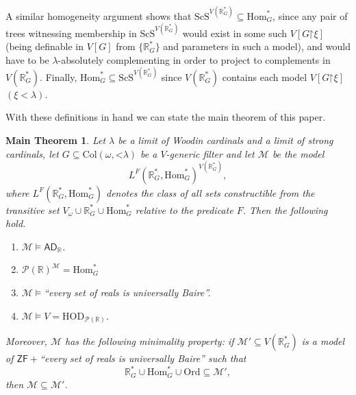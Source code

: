 \documentclass[fleqn, 11pt]{amsart}
\theoremstyle{plain}
\newtheorem*{mainthm*}{Main Theorem}
\theoremstyle{definition}
\theoremstyle{remark}
\newcommand{\Ord}{\mathrm{Ord}}
\newcommand{\HOD}{\mathrm{HOD}}
\newcommand{\Hom}{\mathrm{Hom}}
\newcommand{\ScS}{\mathrm{ScS}}
\newcommand{\HC}{\mathrm{HC}}
\newcommand{\bbR}{\mathbb{R}}
\newcommand{\ADR}{\mathsf{AD}_{\bbR}}
\newcommand{\Col}{\mathrm{Col}}
\newcommand{\restrict}{\mathord{\restriction}}
\newcommand{\powerset}{\mathcal{P}}
\begin{document}
A similar homogeneity argument shows that 
$\ScS^{V(\mathbb{R}^*_G)} \subseteq \Hom^*_G$, since any pair of trees witnessing membership in $\ScS^{V(\mathbb{R}^*_G)}$ would exist in some such $V[G \restrict \xi]$ (being definable in $V[G]$ from $\{\bbR^{*}_{G}\}$ and parameters in such a model), and would have to be $\lambda$-absolutely complementing in order to project to complements in $V(\mathbb{R}^{*}_{G})$. 
Finally, $\Hom^{*}_{G} \subseteq \ScS^{V(\bbR^{*}_{G})}$ since $V(\bbR^{*}_{G})$ contains each model $V[G \restrict \xi]$ $(\xi < \lambda)$. 


With these definitions in hand we can state the main theorem of this paper. 


\begin{mainthm*}
 Let $\lambda$ be a limit of Woodin cardinals and a limit of strong cardinals, let $G \subseteq \Col(\omega,\mathord{<}\lambda)$ be a $V$-generic filter and let $\mathcal{M}$ be the model \[L^F(\mathbb{R}^*_G, \Hom^*_G)^{V(\mathbb{R}^*_G)},\]
 where $L^F(\mathbb{R}^*_G, \Hom^*_G)$ denotes the class of all sets constructible from the transitive set $V_\omega \cup \mathbb{R}^*_G \cup \Hom^*_G$
 relative to the predicate $F$.
 Then the following hold. 
 \begin{enumerate}
  \item\label{item-ad-plus} $\mathcal{M} \models \ADR$.

  \item\label{item-powerset-R-M-is-homstar} $\powerset(\mathbb{R})^\mathcal{M} = \Hom^*_G$

  \item\label{item-every-set-ub} $\mathcal{M} \models {}$``every set of reals is universally Baire''. 

  \item\label{item-satisfies-V-is-HOD-P-R} $\mathcal{M} \models V = \HOD_{\powerset(\mathbb{R})}$.

 \end{enumerate}

Moreover, $\mathcal{M}$ has the following minimality property: if $\mathcal{M}' \subseteq V(\bbR^{*}_{G})$ is a model of $\mathsf{ZF} + {}$``every set of reals is universally Baire'' such that \[\mathbb{R}^*_G \cup \Hom^*_G \cup \Ord \subseteq \mathcal{M}',\] then $\mathcal{M} \subseteq \mathcal{M}'$.

\end{mainthm*}
\end{document}
